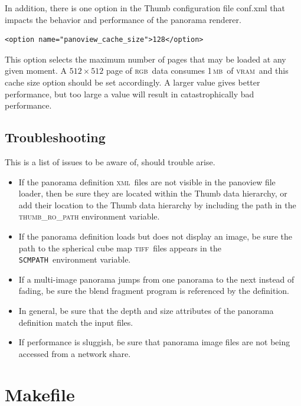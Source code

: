 \documentclass[oneside,10pt]{memoir}
\newcommand{\tiff}    {\textsc{tiff}}
\newcommand{\xml}     {\textsc{xml}}
\newcommand{\scmpath}{\texttt{SCMPATH}}
\newcommand{\rgb}     {\textsc{rgb}}
\newcommand{\mb}    {\,\textsc{mb}}
\newcommand{\vram}    {\textsc{vram}}
\begin{document}
\begin{Spacing}{1.1}
In addition, there is one option in the Thumb configuration file conf.xml that impacts the behavior and performance of the panorama renderer.


\begin{Verbatim}
<option name="panoview_cache_size">128</option>
\end{Verbatim}

This option selects the maximum number of pages that may be loaded at any given moment. A $512\times 512$ page of \rgb\ data consumes 1\mb\ of \vram\, and this cache size option should be set accordingly. A larger value gives better performance, but too large a value will result in catastrophically bad performance.

\section{Troubleshooting}

This is a list of issues to be aware of, should trouble arise.

\begin{itemize}
\item If the panorama definition \xml\ files are not visible in the panoview file loader, then be sure they are located within the Thumb data hierarchy, or add their location to the Thumb data hierarchy by including the path in the \textsc{thumb\_ro\_path} environment variable.

\item If the panorama definition loads but does not display an image, be sure the path to the spherical cube map \tiff\ files appears in the \scmpath\ environment variable.

\item If a multi-image panorama jumps from one panorama to the next instead of fading, be sure the blend fragment program is referenced by the definition.

\item In general, be sure that the depth and size attributes of the panorama definition match the input files.

\item If performance is sluggish, be sure that panorama image files are not being accessed from a network share.
\end{itemize}

\appendix
\chapter{Makefile}
\label{cha:makefile}


\end{Spacing}
\end{document}
